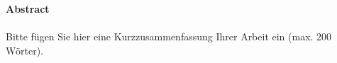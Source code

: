 \documentclass[11pt]{article} %
\begin{document}
\parindent 0pt







\clearpage

\Large \textbf{Abstract}\\
\\
\normalsize
Bitte fügen Sie hier eine Kurzzusammenfassung Ihrer Arbeit ein (max. 200 Wörter).
\newpage

\begin{spacing}{1.5}


\tableofcontents
\clearpage


\listoffigures
\clearpage


\listoftables
\clearpage






%


\clearpage










\clearpage











\clearpage

\clearpage






\clearpage





\clearpage






\clearpage

\end{spacing}
\end{document}
